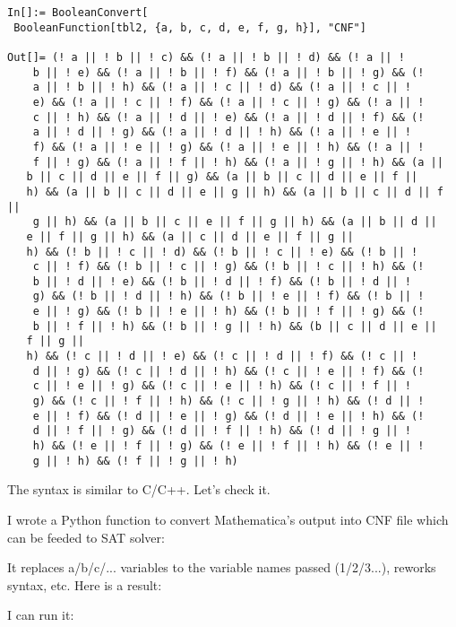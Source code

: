 \begin{lstlisting}
In[]:= BooleanConvert[
 BooleanFunction[tbl2, {a, b, c, d, e, f, g, h}], "CNF"]

Out[]= (! a || ! b || ! c) && (! a || ! b || ! d) && (! a || ! 
    b || ! e) && (! a || ! b || ! f) && (! a || ! b || ! g) && (! 
    a || ! b || ! h) && (! a || ! c || ! d) && (! a || ! c || ! 
    e) && (! a || ! c || ! f) && (! a || ! c || ! g) && (! a || ! 
    c || ! h) && (! a || ! d || ! e) && (! a || ! d || ! f) && (! 
    a || ! d || ! g) && (! a || ! d || ! h) && (! a || ! e || ! 
    f) && (! a || ! e || ! g) && (! a || ! e || ! h) && (! a || ! 
    f || ! g) && (! a || ! f || ! h) && (! a || ! g || ! h) && (a || 
   b || c || d || e || f || g) && (a || b || c || d || e || f || 
   h) && (a || b || c || d || e || g || h) && (a || b || c || d || f ||
    g || h) && (a || b || c || e || f || g || h) && (a || b || d || 
   e || f || g || h) && (a || c || d || e || f || g || 
   h) && (! b || ! c || ! d) && (! b || ! c || ! e) && (! b || ! 
    c || ! f) && (! b || ! c || ! g) && (! b || ! c || ! h) && (! 
    b || ! d || ! e) && (! b || ! d || ! f) && (! b || ! d || ! 
    g) && (! b || ! d || ! h) && (! b || ! e || ! f) && (! b || ! 
    e || ! g) && (! b || ! e || ! h) && (! b || ! f || ! g) && (! 
    b || ! f || ! h) && (! b || ! g || ! h) && (b || c || d || e || 
   f || g || 
   h) && (! c || ! d || ! e) && (! c || ! d || ! f) && (! c || ! 
    d || ! g) && (! c || ! d || ! h) && (! c || ! e || ! f) && (! 
    c || ! e || ! g) && (! c || ! e || ! h) && (! c || ! f || ! 
    g) && (! c || ! f || ! h) && (! c || ! g || ! h) && (! d || ! 
    e || ! f) && (! d || ! e || ! g) && (! d || ! e || ! h) && (! 
    d || ! f || ! g) && (! d || ! f || ! h) && (! d || ! g || ! 
    h) && (! e || ! f || ! g) && (! e || ! f || ! h) && (! e || ! 
    g || ! h) && (! f || ! g || ! h)
\end{lstlisting}

The syntax is similar to C/C++.
Let's check it.

I wrote a Python function to convert Mathematica's output into \ac{CNF} file which can be feeded to SAT solver:



It replaces a/b/c/... variables to the variable names passed (1/2/3...), reworks syntax, etc.
Here is a result:



I can run it:


